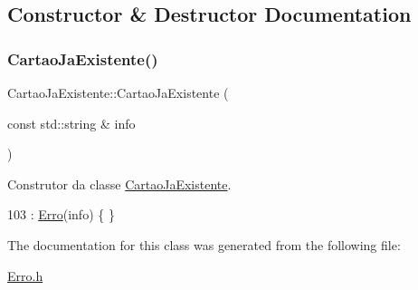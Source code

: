 \subsection{Constructor \& Destructor Documentation}
\mbox{\label{classCartaoJaExistente_ab3efa558a7577d97eff97b81aabc1647}} 
\subsubsection{\texorpdfstring{Cartao\+Ja\+Existente()}{CartaoJaExistente()}}
{\footnotesize\ttfamily Cartao\+Ja\+Existente\+::\+Cartao\+Ja\+Existente (\begin{DoxyParamCaption}\item[{const std\+::string \&}]{info }\end{DoxyParamCaption})\hspace{0.3cm}{\ttfamily [inline]}}



Construtor da classe \hyperlink{classCartaoJaExistente}{Cartao\+Ja\+Existente}. 


\begin{DoxyCode}
103 : \hyperlink{classErro_a15d79796bd17517ff05d45eee55556f1}{Erro}(info) \{ \}
\end{DoxyCode}


The documentation for this class was generated from the following file\+:\begin{DoxyCompactItemize}
\item 
\hyperlink{Erro_8h}{Erro.\+h}\end{DoxyCompactItemize}
